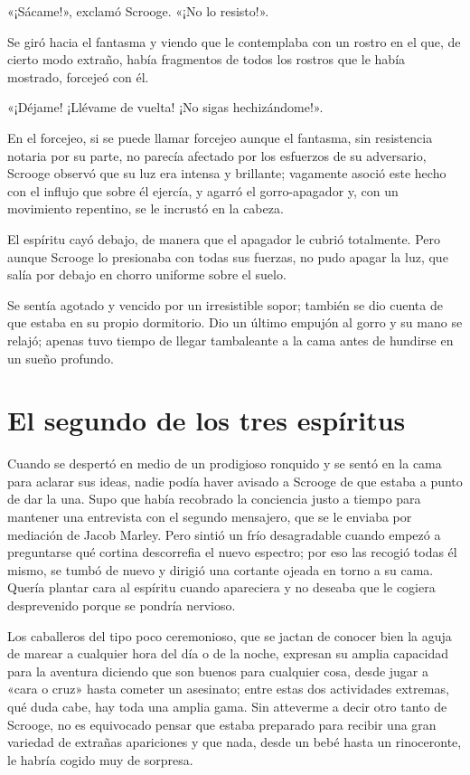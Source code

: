 \documentclass{novela}
\begin{document}
 «¡Sácame!», exclamó Scrooge. «¡No lo resisto!».

 Se giró hacia el fantasma y viendo que le contemplaba con un rostro en el que, de cierto modo extraño, había fragmentos de todos los rostros que le había mostrado, forcejeó con él.

 «¡Déjame! ¡Llévame de vuelta! ¡No sigas hechizándome!».

 En el forcejeo, si se puede llamar forcejeo aunque el fantasma, sin resistencia notaria por su parte, no parecía afectado por los esfuerzos de su adversario, Scrooge observó que su luz era intensa y brillante; vagamente asoció este hecho con el influjo que sobre él ejercía, y agarró el gorro-apagador y, con un movimiento repentino, se le incrustó en la cabeza.

 El espíritu cayó debajo, de manera que el apagador le cubrió totalmente. Pero aunque Scrooge lo presionaba con todas sus fuerzas, no pudo apagar la luz, que salía por debajo en chorro uniforme sobre el suelo.

 Se sentía agotado y vencido por un irresistible sopor; también se dio cuenta de que estaba en su propio dormitorio. Dio un último empujón al gorro y su mano se relajó; apenas tuvo tiempo de llegar tambaleante a la cama antes de hundirse en un sueño profundo.




 \chapter{El segundo de los tres espíritus}



 Cuando se despertó en medio de un prodigioso ronquido y se sentó en la cama para aclarar sus ideas, nadie podía haver avisado a Scrooge de que estaba a punto de dar la una. Supo que había recobrado la conciencia justo a tiempo para mantener una entrevista con el segundo mensajero, que se le enviaba por mediación de Jacob Marley. Pero sintió un frío desagradable cuando empezó a preguntarse qué cortina descorrefia el nuevo espectro; por eso las recogió todas él mismo, se tumbó de nuevo y dirigió una cortante ojeada en torno a su cama. Quería plantar cara al espíritu cuando apareciera y no deseaba que le cogiera desprevenido porque se pondría nervioso.

 Los caballeros del tipo poco ceremonioso, que se jactan de conocer bien la aguja de marear a cualquier hora del día o de la noche, expresan su amplia capacidad para la aventura diciendo que son buenos para cualquier cosa, desde jugar a «cara o cruz» hasta cometer un asesinato; entre estas dos actividades extremas, qué duda cabe, hay toda una amplia gama. Sin atteverme a decir otro tanto de Scrooge, no es equivocado pensar que estaba preparado para recibir una gran variedad de extrañas apariciones y que nada, desde un bebé hasta un rinoceronte, le habría cogido muy de sorpresa.
\end{document}
